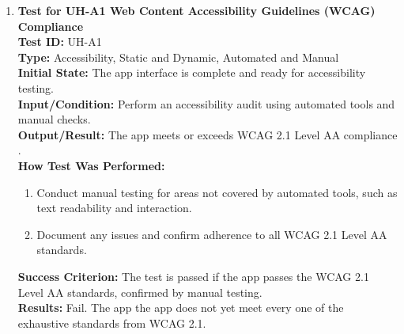 \documentclass[12pt, titlepage]{article}
\begin{document}
\begin{enumerate}
    \item \textbf{Test for UH-A1 Web Content Accessibility Guidelines (WCAG) Compliance} \\
      \newline
      \textbf{Test ID:} UH-A1 \\
      \textbf{Type:} Accessibility, Static and Dynamic, Automated and Manual \\
      \textbf{Initial State:} The app interface is complete and ready for accessibility testing. \\
      \textbf{Input/Condition:} Perform an accessibility audit using automated tools and manual checks. \\
      \textbf{Output/Result:} The app meets or exceeds WCAG 2.1 Level AA compliance \citep*{WCAG21}. \\
      \textbf{How Test Was Performed:}
      \begin{enumerate}
          \item Conduct manual testing for areas not covered by automated tools, such as text readability and interaction.
          \item Document any issues and confirm adherence to all WCAG 2.1 Level AA standards.
      \end{enumerate}
      \textbf{Success Criterion:} The test is passed if the app passes the WCAG 2.1 Level AA standards, confirmed by manual testing.\\
      \textbf{Results:} Fail. The app the app does not yet meet every one of the exhaustive standards from WCAG 2.1.\\
\end{enumerate}
\end{document}
